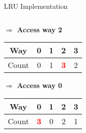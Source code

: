 \documentclass[aspectratio=169,12pt]{beamer}
\begin{document}
\begin{frame}[fragile]{LRU Implementation}
\begin{columns}[T]
\begin{column}{0.30\textwidth}
\vspace{0.4cm}
\textbf{$\Rightarrow$ Access way 2}\\
\vspace{0.1cm}
\begin{tabular}{|c|c|c|c|c|}
\hline
Way & 0 & 1 & 2 & 3 \\
\hline
Count & 0 & 1 & \textcolor{red}{\textbf{3}} & 2 \\
\hline
\end{tabular}

\vspace{0.4cm}
\textbf{$\Rightarrow$ Access way 0}\\
\vspace{0.1cm}
\begin{tabular}{|c|c|c|c|c|}
\hline
Way & 0 & 1 & 2 & 3 \\
\hline
Count & \textcolor{red}{\textbf{3}} & 0 & 2 & 1 \\
\hline
\end{tabular}
\end{column}
\end{columns}
\end{frame}
\end{document}
